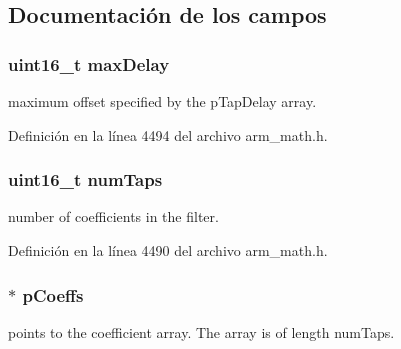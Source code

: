 \subsection{Documentación de los campos}
\subsubsection[{\texorpdfstring{max\+Delay}{maxDelay}}]{\setlength{\rightskip}{0pt plus 5cm}uint16\+\_\+t max\+Delay}\hypertarget{structarm__fir__sparse__instance__f32_ab25f4ee7550e6d92acff77ada283733f}{}\label{structarm__fir__sparse__instance__f32_ab25f4ee7550e6d92acff77ada283733f}
maximum offset specified by the p\+Tap\+Delay array. 

Definición en la línea 4494 del archivo arm\+\_\+math.\+h.

\subsubsection[{\texorpdfstring{num\+Taps}{numTaps}}]{\setlength{\rightskip}{0pt plus 5cm}uint16\+\_\+t num\+Taps}\hypertarget{structarm__fir__sparse__instance__f32_a751941891e47f522a7f5375fe8990aac}{}\label{structarm__fir__sparse__instance__f32_a751941891e47f522a7f5375fe8990aac}
number of coefficients in the filter. 

Definición en la línea 4490 del archivo arm\+\_\+math.\+h.

\subsubsection[{\texorpdfstring{p\+Coeffs}{pCoeffs}}]{$\ast$ p\+Coeffs}\hypertarget{structarm__fir__sparse__instance__f32_aacbb8dd8eeba4b21fc2bb40076405ee3}{}\label{structarm__fir__sparse__instance__f32_aacbb8dd8eeba4b21fc2bb40076405ee3}
points to the coefficient array. The array is of length num\+Taps. 

